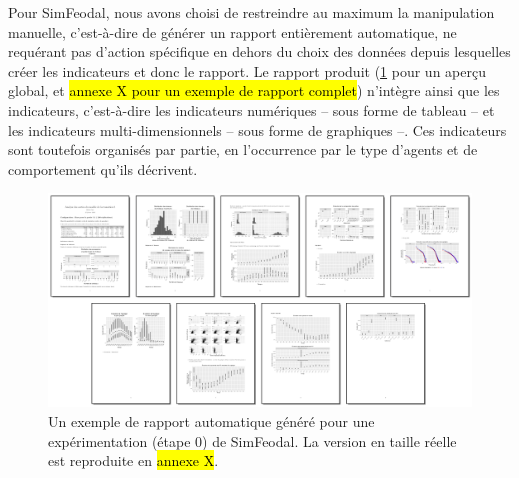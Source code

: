 	Pour SimFeodal, nous avons choisi de restreindre au maximum la manipulation manuelle, c'est-à-dire de générer un rapport entièrement automatique, ne requérant pas d'action spécifique en dehors du choix des données depuis lesquelles créer les indicateurs et donc le rapport.
	Le rapport produit (\cref{fig:simfeodal_rapport_mini} pour un aperçu global, et \hl{annexe X pour un exemple de rapport complet}) n'intègre ainsi que les indicateurs, c'est-à-dire les indicateurs numériques -- sous forme de tableau -- et les indicateurs multi-dimensionnels -- sous forme de graphiques --.
	Ces indicateurs sont toutefois organisés par partie, en l'occurrence par le type d'agents et de comportement qu'ils décrivent.

	\begin{figure}[H]
		\captionsetup{width=\linewidth}
		\includegraphics[width=\linewidth]{img/SimFeodal_Rapport_exemple.png}
		\caption{Un exemple de rapport automatique généré pour une expérimentation (étape 0) de SimFeodal. La version en taille réelle est reproduite en \hl{annexe X}.}
		\label{fig:simfeodal_rapport_mini}
	\end{figure}

